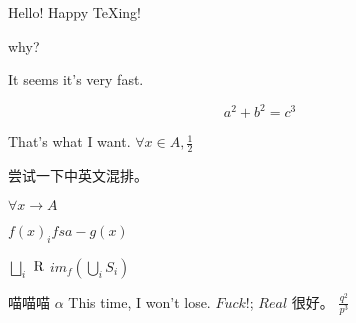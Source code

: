 \documentclass[utf8]{ctexart}
\begin{document}
Hello!
Happy \TeX ing!

why?

It seems it's very fast.

\begin{equation}
    a^2+b^2=c^3
\end{equation}

That's what I want.
\(\forall x \in A, \frac{1}{2}\)

尝试一下中英文混排。

\(\forall x \to A\)

\(f(x)_{i}  fsa- g(x)\)

\(\bigsqcup_{i}\)
\(\rm{R}\)
\(im_{f}(\bigcup_{i}S_{i})\)

喵喵喵
\(\alpha\)
This time, I won't lose. \(Fuck!\);
\( Real\)
很好。
\(\frac{q^{2}}{p^{3}}\)
\end{document}
